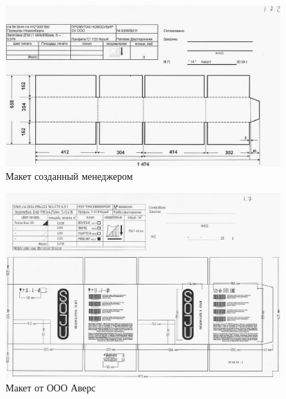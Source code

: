 \begin{figure}
\begin{center}
  \includegraphics[height=0.94\textheight, width=0.94\textwidth, keepaspectratio]{Pics 1/1.7.2 Макет от менеджера_0001.jpg }
\end{center}
  \caption{Макет созданный менеджером}
  \label{pic:1.7.2 Макет от менеджера_0001}
\end{figure}

\begin{figure}
\begin{center}
  \includegraphics[height=0.94\textheight, width=0.94\textwidth, keepaspectratio]{Pics 1/1.7.1 дизайн от Аверс_0001.jpg }
\end{center}
  \caption{Макет от ООО Аверс}
  \label{pic:1.7.1 дизайн от Аверс_0001}
\end{figure}

